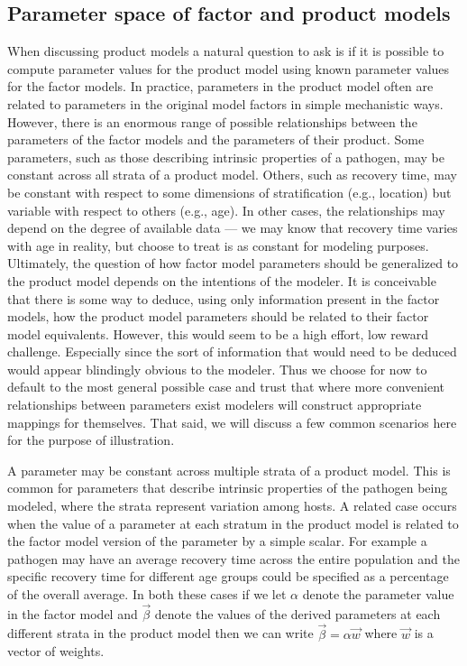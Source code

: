 \documentclass[pdflatex,sn-basic]{sn-jnl}%
\theoremstyle{definition}
\newcommand{\betavec}{\vec{\beta}}
\begin{document}
\subsection{Parameter space of factor and product models}

When discussing product models a natural question to ask is if it is possible to compute parameter values for the product model using known parameter values for the factor models.
In practice, parameters in the product model often are related to parameters in the original model factors in simple mechanistic ways. However, there is an enormous range of possible relationships between the parameters of the factor models and the parameters of their product.
Some parameters, such as those describing intrinsic properties of a pathogen, may be constant across all strata of a product model. Others, such as recovery time, may be constant with respect to some dimensions of stratification (e.g., location) but variable with respect to others (e.g., age). In other cases, the relationships may depend on the degree of available data --- we may know that recovery time varies with age in reality, but choose to treat is as constant for modeling purposes. Ultimately, the question of how factor model parameters should be generalized to the product model depends on the intentions of the modeler. It is conceivable that there is some way to deduce, using only information present in the factor models, how the product model parameters should be related to their factor model equivalents. However, this would seem to be a high effort, low reward challenge. Especially since the sort of information that would need to be deduced would appear blindingly obvious to the modeler. Thus we choose for now to default to the most general possible case and trust that where more convenient relationships between parameters exist modelers will construct appropriate mappings for themselves. That said, we will discuss a few common scenarios here for the purpose of illustration. 

A parameter may be constant across multiple strata of a product model. This is common for parameters that describe intrinsic properties of the pathogen being modeled, where the strata represent variation among hosts. A related case occurs when the value of a parameter at each stratum in the product model is related to the factor model version of the parameter by a simple scalar. For example a pathogen may have an average recovery time across the entire population and the specific recovery time for different age groups could be specified as a percentage of the overall average. In both these cases if we let $\alpha$ denote the parameter value in the factor model and $\betavec$ denote the values of the derived parameters at each different strata in the product model then we can write $\betavec = \alpha\vec{w}$ where $\vec{w}$ is a vector of weights.
\end{document}
